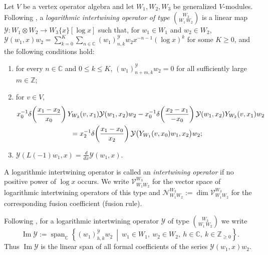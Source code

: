 \documentclass[12pt,leqno]{amsart}
\numberwithin{equation}{section} \newtheorem{thm}{Theorem}[section] \newtheorem{lem}[thm]{Lemma} \newtheorem{ex}[thm]{Example} \newtheorem{prop}[thm]{Proposition} \newtheorem{cor}[thm]{Corollary} \newtheorem{defi}[thm]{Definition} \newtheorem{rmk}[thm]{Remark} \newtheorem{notation}[thm]{Notation}
\def\Z{\mathbb{Z}} \def\N{\mathbb{N}} \def\A{\mathbb{A}} \def\C{\mathbb{C}} \def\R{\mathbb{R}} \def\Q{\mathbb{Q}} \def\F{\mathbb{F}}
\begin{document}
Let $V$ be a vertex operator algebra and let $W_1,W_2,W_3$ be generalized $V$-modules. Following \cite[Section~2.1]{CJORY}, a \emph{logarithmic intertwining operator of type $\binom{W_3}{W_1\,W_2}$} is a linear map \(\mathcal Y:W_1\otimes W_2\longrightarrow W_3\{x\}[\log x]\) such that, for $w_1\in W_1$ and $w_2\in W_2$, \(\mathcal Y(w_1,x)w_2=\sum_{k=0}^{K}\sum_{n\in\C}(w_1)^{\mathcal Y}_{n,k}w_2 x^{-n-1}(\log x)^k\) for some $K\ge0$, and the following conditions hold:
\begin{enumerate}[label=\textnormal{(\roman*)}]
\item for every $n\in\C$ and $0\le k\le K$,
\((w_1)^{\mathcal Y}_{n+m,k}w_2=0\) for all sufficiently large $m\in\Z$;
\item for $v\in V$,
\begin{align*}
&x_0^{-1}\delta\!\left(\frac{x_1-x_2}{x_0}\right)
Y_{W_3}(v,x_1)\mathcal Y(w_1,x_2)w_2
-x_0^{-1}\delta\!\left(\frac{x_2-x_1}{-x_0}\right)
\mathcal Y(w_1,x_2)Y_{W_2}(v,x_1)w_2\\
&\hspace{27mm}=
 x_2^{-1}\delta\!\left(\frac{x_1-x_0}{x_2}\right)
\mathcal Y\bigl(Y_{W_1}(v,x_0)w_1,x_2\bigr)w_2;
\end{align*}
\item
\(\mathcal Y(L(-1)w_1,x)=\frac{d}{dx}\mathcal Y(w_1,x).\)
\end{enumerate}
A logarithmic intertwining operator is called an \emph{intertwining operator} if no positive power of $\log x$ occurs. We write \(\mathcal V^{W_3}_{W_1 W_2}\) for the vector space of logarithmic intertwining operators of this type and \(\mathcal N^{W_3}_{W_1 W_2}:=\dim\mathcal V^{W_3}_{W_1 W_2}\) for the corresponding fusion coefficient (fusion rule).

Following \cite[\S2]{CMY}, for a logarithmic intertwining operator $\mathcal Y$ of type $\binom{W_3}{W_1\,W_2}$ we write
\[
\operatorname{Im}\mathcal Y
:=
\operatorname{span}_{\C}
\left\{
(w_1)^{\mathcal Y}_{h,k}w_2
\ \middle|\
w_1\in W_1,\ w_2\in W_2,\ h\in\C,\ k\in\Z_{\ge0}
\right\}.
\]
Thus $\operatorname{Im}\mathcal Y$ is the linear span of all formal coefficients of the series $\mathcal Y(w_1,x)w_2$.
\end{document}
